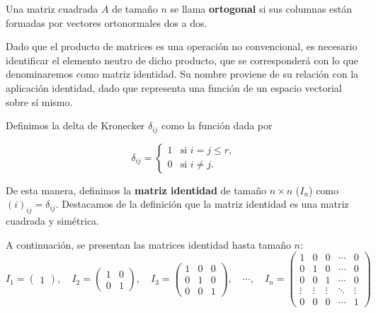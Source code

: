 \begin{definicion}
    Una matriz cuadrada $A$ de tamaño $n$ se llama \textbf{ortogonal} si sus columnas están formadas por vectores ortonormales dos a dos.\newline
\end{definicion}

Dado que el producto de matrices es una operación no convencional, es necesario identificar el elemento neutro de dicho producto, que se corresponderá con lo que denominaremos como matriz identidad. Su nombre proviene de su relación con la aplicación identidad, dado que representa una función de un espacio vectorial sobre sí mismo.

\begin{definicion}
    Definimos la delta de Kronecker $\delta_{ij}$ como la función dada por

    \[
        \delta_{ij} =
        \begin{cases}
            1 & \text{si } i = j \leq r, \\
            0 & \text{si } i \neq j.
        \end{cases}
    \]

    De esta manera, definimos la \textbf{matriz identidad} de tamaño $n \times n$ ($I_{n}$) como $(i)_{ij} = \delta_{ij}$. Destacamos de la definición que la matriz identidad es una matriz cuadrada y simétrica.\newline
\end{definicion}

\begin{ejemplo}
    A continuación, se presentan las matrices identidad hasta tamaño $n$:
    \[
        I_1 = \begin{pmatrix} 1 \end{pmatrix}, \quad
        I_2 = \begin{pmatrix} 1 & 0 \\ 0 & 1 \end{pmatrix}, \quad
        I_3 = \begin{pmatrix} 1 & 0 & 0 \\ 0 & 1 & 0 \\ 0 & 0 & 1 \end{pmatrix}, \quad \cdots, \quad
        I_n = \begin{pmatrix} 
        1 & 0 & 0 & \cdots & 0 \\ 
        0 & 1 & 0 & \cdots & 0 \\ 
        0 & 0 & 1 & \cdots & 0 \\ 
        \vdots & \vdots & \vdots & \ddots & \vdots \\ 
        0 & 0 & 0 & \cdots & 1 
        \end{pmatrix}
    \]\newline
\end{ejemplo}

